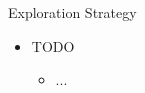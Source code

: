 \begin{Slide}{Exploration Strategy}
\begin{itemize}
\item TODO
\begin{itemize}
\item ...

\end{itemize}
\end{itemize}
\end{Slide}